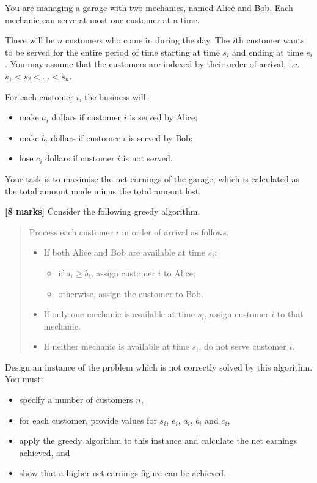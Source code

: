 \documentclass{article}
\begin{document}
\setcounter{question}{1}

\begin{Question}
You are managing a garage with two mechanics, named Alice and Bob. Each mechanic can serve at most one customer at a time.

There will be $n$ customers who come in during the day. The $i$th customer wants to be served for the entire period of time starting at time $s_i$ and ending at time $e_i$. You may assume that the customers are indexed by their order of arrival, i.e. $s_1 < s_2 < \ldots < s_n$.

For each customer $i$, the business will:
\begin{itemize}
    \item make $a_i$ dollars if customer $i$ is served by Alice;
    \item make $b_i$ dollars if customer $i$ is served by Bob;
    \item lose $c_i$ dollars if customer $i$ is not served.
\end{itemize}

Your task is to maximise the net earnings of the garage, which is calculated as the total amount made minus the total amount lost.

\begin{Subquestion}
\textbf{[8 marks]} Consider the following greedy algorithm.

\begin{quote}
    Process each customer $i$ in order of arrival as follows.
    \begin{itemize}
        \item If both Alice and Bob are available at time $s_i$:
        \begin{itemize}
            \item if $a_i \ge b_i$, assign customer $i$ to Alice;
            \item otherwise, assign the customer to Bob.
        \end{itemize}
        \item If only one mechanic is available at time $s_i$, assign customer $i$ to that mechanic.
        \item If neither mechanic is available at time $s_i$, do not serve customer $i$.
    \end{itemize}
\end{quote}

Design an instance of the problem which is not correctly solved by this algorithm. You must:
\begin{itemize}
    \item specify a number of customers $n$,
    \item for each customer, provide values for $s_i$, $e_i$, $a_i$, $b_i$ and $c_i$,
    \item apply the greedy algorithm to this instance and calculate the net earnings achieved, and
    \item show that a higher net earnings figure can be achieved.
\end{itemize}


\end{Subquestion}
\end{Question}
\end{document}
